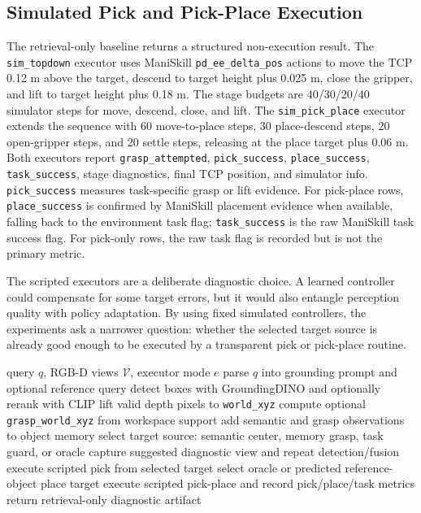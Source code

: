 \documentclass[conference]{IEEEtran}
\begin{document}
\subsection{Simulated Pick and Pick-Place Execution}

The retrieval-only baseline returns a structured non-execution result. The
\texttt{sim\_topdown} executor uses ManiSkill \texttt{pd\_ee\_delta\_pos}
actions to move the TCP 0.12 m above the target, descend to target height plus
0.025 m, close the gripper, and lift to target height plus 0.18 m. The stage
budgets are 40/30/20/40 simulator steps for move, descend, close, and lift.
The \texttt{sim\_pick\_place} executor extends the sequence with 60
move-to-place steps, 30 place-descend steps, 20 open-gripper steps, and 20
settle steps, releasing at the place target plus 0.06 m. Both executors report
\texttt{grasp\_attempted}, \texttt{pick\_success}, \texttt{place\_success},
\texttt{task\_success}, stage diagnostics, final TCP position, and simulator
info. \texttt{pick\_success} measures task-specific grasp or lift evidence.
For pick-place rows, \texttt{place\_success} is confirmed by ManiSkill
placement evidence when available, falling back to the environment task flag;
\texttt{task\_success} is the raw ManiSkill task success flag. For pick-only
rows, the raw task flag is recorded but is not the primary metric.

The scripted executors are a deliberate diagnostic choice. A learned controller
could compensate for some target errors, but it would also entangle perception
quality with policy adaptation. By using fixed simulated controllers, the
experiments ask a narrower question: whether the selected target source is
already good enough to be executed by a transparent pick or pick-place routine.

\begin{algorithm}[t]
\caption{Query-to-Grasp Target Selection and Execution}
\label{alg:q2g}
\begin{algorithmic}[1]
\Require query $q$, RGB-D views $\mathcal{V}$, executor mode $e$
\State parse $q$ into grounding prompt and optional reference query
  \State detect boxes with GroundingDINO and optionally rerank with CLIP
  \State lift valid depth pixels to \texttt{world\_xyz}
  \State compute optional \texttt{grasp\_world\_xyz} from workspace support
  \State add semantic and grasp observations to object memory
\EndFor
\State select target source: semantic center, memory grasp, task guard, or oracle
  \State capture suggested diagnostic view and repeat detection/fusion
\EndIf
{}
  \State execute scripted pick from selected target
  \State select oracle or predicted reference-object place target
  \State execute scripted pick-place and record pick/place/task metrics
\Else
  \State return retrieval-only diagnostic artifact
\EndIf
\end{algorithmic}
\end{algorithm}
\end{document}

